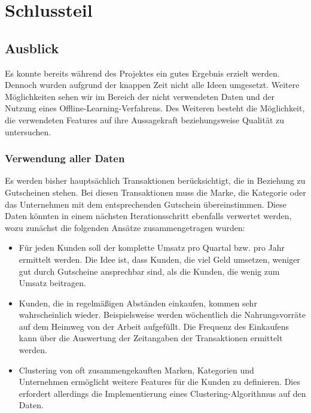 \section{Schlussteil}

\subsection{Ausblick}
Es konnte bereits während des Projektes ein gutes Ergebnis erzielt
werden. Dennoch wurden aufgrund der knappen Zeit nicht alle Ideen
umgesetzt. Weitere Möglichkeiten sehen wir im Bereich der nicht
verwendeten Daten und der Nutzung eines Offline-Learning-Verfahrens.
Des Weiteren besteht die Möglichkeit, die verwendeten Features auf ihre
Aussagekraft beziehungsweise Qualität zu untersuchen.

\subsubsection{Verwendung aller Daten}
Es werden bisher hauptsächlich Transaktionen berücksichtigt, die in Beziehung zu Gutscheinen stehen.
Bei diesen Transaktionen muss die Marke, die Kategorie oder das Unternehmen mit dem entsprechenden Gutschein übereinstimmen.
Diese Daten könnten in einem nächsten Iterationsschritt ebenfalls verwertet werden, wozu zunächst die folgenden Ansätze zusammengetragen wurden:
	
\begin{itemize}
\item Für jeden Kunden soll der komplette Umsatz pro Quartal bzw. pro Jahr ermittelt werden. Die Idee ist, dass Kunden, die viel Geld umsetzen, weniger gut durch Gutscheine ansprechbar sind, als die Kunden, die wenig zum Umsatz beitragen. 
 
\item Kunden, die in regelmäßigen Abständen einkaufen, kommen sehr wahrscheinlich wieder.
Beispielsweise werden wöchentlich die Nahrungsvorräte auf dem Heimweg von der Arbeit aufgefüllt.
Die Frequenz des Einkaufens kann über die Auswertung der Zeitangaben der Transaktionen ermittelt werden.

\item Clustering von oft zusammengekauften Marken, Kategorien und Unternehmen
ermöglicht weitere Features für die Kunden zu definieren.
Dies erfordert allerdings die Implementierung eines Clustering-Algorithmus
auf den Daten.
\end{itemize}

